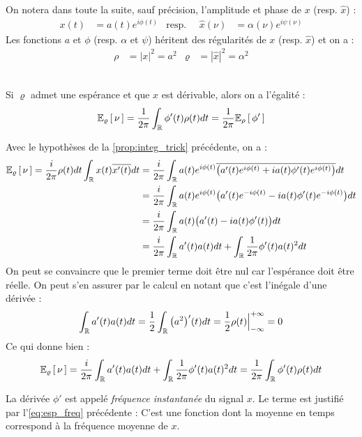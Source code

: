 On notera dans toute la suite, sauf précision, l'amplitude et phase de $x$ (resp. $\hat{x}$) :
\begin{align*}
	x(t) &= a(t) e^{i\phi(t)}  &  \text{resp. }\quad \hat{x}(\nu) &= \alpha(\nu) e^{i\psi(\nu)}
\end{align*}
Les fonctions $a$ et $\phi$ (resp. $\alpha$ et $\psi$) héritent des régularités de $x$ (resp. $\hat{x}$) et on a :
\begin{align*}
	\rho &= |x|^2 = a^2  &  \varrho &= |\hat{x}|^2 = \alpha^2
\end{align*}
\\

\begin{proposition}\label{prop.esp_freq}
	Si $\varrho$ admet une espérance et que $x$ est dérivable, alors on a l'égalité :
	\begin{equation}\label{eq:esp_freq}
		\esp[\varrho]{\nu} = \frac{1}{2\pi}\int_\R \phi'(t)\rho(t)dt = \frac{1}{2\pi} \esp[\rho]{\phi'}
	\end{equation}
	
\begin{demo} 
	Avec le hypothèses de la \cref{prop:integ_trick} précédente, on a :
	\begin{align*}
		\esp[\varrho]{\nu} = \frac{i}{2\pi} \rho(t)dt\int_\R x(t) \congu{x'(t)} dt &= \frac{i}{2\pi}\int_\R a(t)e^{i\phi(t)}\congu{\big( a'(t)e^{i\phi(t)}+ ia(t)\phi'(t)e^{i\phi(t)} \big)} dt \\
		&= \frac{i}{2\pi}\int_\R a(t)e^{i\phi(t)}\big( a'(t)e^{-i\phi(t)} -ia(t)\phi'(t)e^{-i\phi(t)} \big) dt \\
		&= \frac{i}{2\pi}\int_\R a(t)\big( a'(t)- ia(t)\phi'(t)\big) dt \\
		&= \frac{i}{2\pi}\int_\R a'(t)a(t) dt + \int_\R  \frac{1}{2\pi}\phi'(t)a(t)^2 dt \\
	\end{align*}
	On peut se convaincre que le premier terme doit être nul car l'espérance doit être réelle. On peut s'en assurer par le calcul en notant que c'est l’inégale d'une dérivée :
	\[\int_\R a'(t)a(t) dt = \frac{1}{2} \int_\R \big(a^2\big)'(t) dt = \frac{1}{2}\rho(t)\Big|_{-\infty}^{+\infty} = 0\]
	Ce qui donne bien :
	\[\esp[\varrho]{\nu} = \frac{i}{2\pi}\int_\R a'(t)a(t) dt + \int_\R  \frac{1}{2\pi}\phi'(t)a(t)^2 dt = \frac{1}{2\pi}\int_\R \phi'(t)\rho(t) dt\]
\end{demo}
\end{proposition}

\begin{definition}
	La dérivée $\phi'$ est appelé \emph{fréquence instantanée} du signal $x$. Le terme est justifié par l'\cref{eq:esp_freq} précédente : C'est une fonction dont la moyenne en temps correspond à la fréquence moyenne de $x$.
\end{definition}

